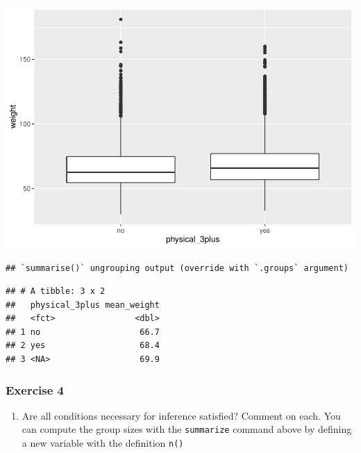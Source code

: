 \documentclass[
]{article}
\newenvironment{Shaded}{\begin{snugshade}}{\end{snugshade}}
\newcommand{\DataTypeTok}[1]{\textcolor[rgb]{0.13,0.29,0.53}{#1}}
\newcommand{\KeywordTok}[1]{\textcolor[rgb]{0.13,0.29,0.53}{\textbf{#1}}}
\newcommand{\NormalTok}[1]{#1}
\newcommand{\OperatorTok}[1]{\textcolor[rgb]{0.81,0.36,0.00}{\textbf{#1}}}
\newcommand{\OtherTok}[1]{\textcolor[rgb]{0.56,0.35,0.01}{#1}}
\newcommand{\StringTok}[1]{\textcolor[rgb]{0.31,0.60,0.02}{#1}}
\providecommand{\tightlist}{%
  \setlength{\itemsep}{0pt}\setlength{\parskip}{0pt}}
\begin{document}
\includegraphics{lab_7_files/figure-latex/unnamed-chunk-3-1.pdf}

\begin{Shaded}
\end{Shaded}

\begin{verbatim}
## `summarise()` ungrouping output (override with `.groups` argument)
\end{verbatim}

\begin{verbatim}
## # A tibble: 3 x 2
##   physical_3plus mean_weight
##   <fct>                <dbl>
## 1 no                    66.7
## 2 yes                   68.4
## 3 <NA>                  69.9
\end{verbatim}

\hypertarget{exercise-4}{%
\subsubsection{Exercise 4}\label{exercise-4}}

\begin{enumerate}
\def\labelenumi{\arabic{enumi}.}
\tightlist
\item
  Are all conditions necessary for inference satisfied? Comment on each.
  You can compute the group sizes with the \texttt{summarize} command
  above by defining a new variable with the definition \texttt{n()}
\end{enumerate}
\end{document}

